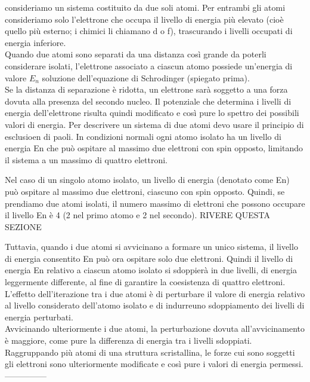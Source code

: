 consideriamo un sistema costituito da due soli atomi. 
Per entrambi gli atomi consideriamo solo l'elettrone che occupa il livello di energia più elevato (cioè quello più esterno; i chimici li chiamano d o f), trascurando i livelli occupati di energia inferiore.\\
Quando due atomi sono separati da una distanza così grande da poterli considerare isolati, l'elettrone associato a ciascun atomo possiede un'energia di valore $E_n$ soluzione dell'equazione di Schrodinger (spiegato prima).\\
Se la distanza di separazione è ridotta, un elettrone sarà soggetto a una forza dovuta alla presenza del secondo nucleo. Il potenziale che determina i livelli di energia dell'elettrone risulta quindi modificato e così pure lo spettro dei possibili valori di energia. Per descrivere un sistema di due atomi devo usare il principio di esclusioen di paoli. In condizioni normali ogni atomo isolato ha un livello di energia En che può ospitare al massimo due elettroni con spin opposto, limitando il sistema a un massimo di quattro elettroni.
%
\begin{psbox}
    Nel caso di un singolo atomo isolato, un livello di energia (denotato come En) può ospitare al massimo due elettroni, ciascuno con spin opposto. Quindi, se prendiamo due atomi isolati, il numero massimo di elettroni che possono occupare il livello En è 4 (2 nel primo atomo e 2 nel secondo).
    RIVERE QUESTA SEZIONE
\end{psbox}
%
 Tuttavia, quando i due atomi si avvicinano a formare un unico sistema, il livello di energia consentito En può ora ospitare solo due elettroni. Quindi il livello di energia En relativo a ciascun atomo isolato si sdoppierà in due livelli, di energia leggermente differente, al fine di garantire la coesistenza di quattro elettroni.\\
L'effetto dell'iterazione tra i due atomi è di perturbare il valore di energia relativo al livello considerato dell'atomo isolato e di indurreuno sdoppiamento dei livelli di energia perturbati.\\
Avvicinando ulteriormente i due atomi, la perturbazione dovuta all'avvicinamento è maggiore, come pure la differenza di energia tra i livelli sdoppiati.\\
Raggruppando più atomi di una struttura scristallina, le forze cui sono soggetti gli elettroni sono ulteriormente modificate e così pure i valori di energia permessi.\\
---------------\\
